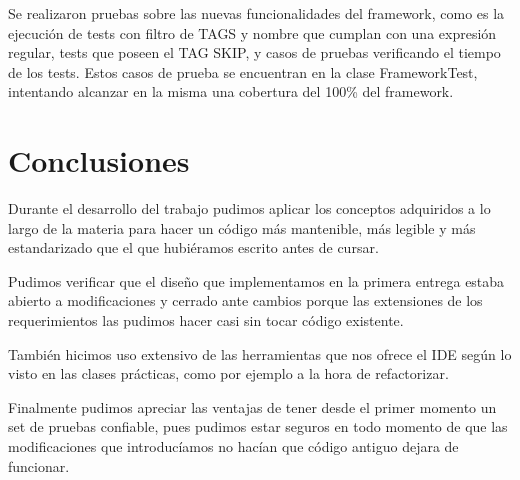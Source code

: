 \documentclass[12pt]{article}
\begin{document}
	Se realizaron pruebas sobre las nuevas funcionalidades del framework, como
	 es la ejecución de tests con filtro de TAGS y nombre que cumplan con una expresión 
	regular, tests que poseen el TAG SKIP, y casos de pruebas verificando el tiempo de
	 los tests. Estos casos de prueba se encuentran en la clase FrameworkTest, intentando
	 alcanzar en la misma una cobertura del 100\% del framework.
	
\section{Conclusiones}
Durante el desarrollo del trabajo pudimos aplicar los conceptos adquiridos a lo
largo de la materia para hacer un código más mantenible, más legible y más
estandarizado que el que hubiéramos escrito antes de cursar.

Pudimos verificar que el diseño que implementamos en la primera entrega estaba
abierto a modificaciones y cerrado ante cambios porque las extensiones de los
requerimientos las pudimos hacer casi sin tocar código existente.

También hicimos uso extensivo de las herramientas que nos ofrece el IDE según lo
visto en las clases prácticas, como por ejemplo a la hora de refactorizar.

Finalmente pudimos apreciar las ventajas de tener desde el primer momento un set
de pruebas confiable, pues pudimos estar seguros en todo momento de que las 
modificaciones que introducíamos no hacían que código antiguo dejara de funcionar.
\end{document}
